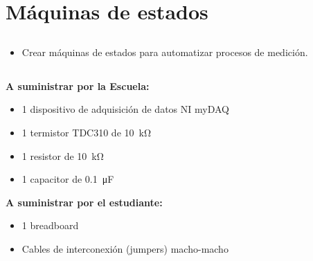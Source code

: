 \chapter{Máquinas de estados}
\section{\obj}
\capacidad
\begin{itemize}
\item Crear máquinas de estados para automatizar procesos de medición.
\end{itemize}

\section{\mat}
\textbf{A suministrar por la Escuela:}
\begin{itemize}
\item 1 dispositivo de adquisición de datos NI myDAQ
\item 1 termistor TDC310 de \SI{10}{\kilo\ohm} 
\item 1 resistor de \SI{10}{\kilo\ohm}
\item 1 capacitor de \SI{0.1}{\micro\farad}

\end{itemize}
\textbf{A suministrar por el estudiante:}
\begin{itemize}
\item 1 breadboard
\item Cables de interconexión (jumpers) macho-macho
\end{itemize}

